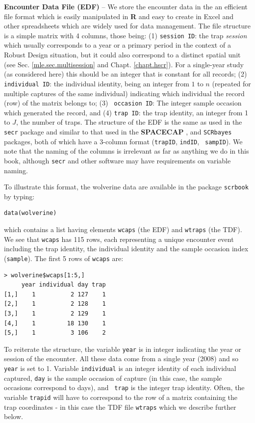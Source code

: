 {\flushleft \bf Encounter Data File (EDF)} --
We store the encounter data in the
an efficient file format which is easily manipulated in {\bf R} and
easy to create in  Excel and other spreadsheets which are widely used
for data management.
The file
structure is a simple matrix with 4 columns, those being: (1)
\mbox{\tt session ID}: the trap
{\it session} which usually corresponds to a year or a primary period
in the context of a Robust Design situation, but it could also
correspond to a distinct spatial unit (see
Sec. \ref{mle.sec.multisession} and Chapt. \ref{chapt.hscr}).
For a single-year study (as considered here) this
should be an integer  that is constant for all records; (2) \mbox{\tt
  individual ID}: the
individual identity, being an integer from $1$ to $n$ (repeated for
multiple captures of the same individual) indicating which
individual the record (row) of the matrix belongs to; (3) \mbox{\tt
  occasion ID}: The integer sample
occasion which generated the record, and (4) \mbox{\tt trap ID}: the
trap identity, an
integer from 1 to $J$, the number of traps.  The structure of the EDF
is the same as used in the \mbox{\tt secr} package \citep{efford:2011}
and similar to that used
in the {\bf SPACECAP} \citep{gopalaswamy_etal:2012mee}, and
\mbox{\tt SCRbayes} \citep{russell_etal:2012} packages, both of which
have a 3-column format (\mbox{\tt trapID}, \mbox{\tt indID}, \mbox{\tt
  sampID}). We note that the naming of the columns is irrelevant as
far as anything we do in this book, although \mbox{\tt secr} and other
software may have requirements on variable naming. 

To illustrate this format, the wolverine data are available in the
package \mbox{\tt scrbook} by typing:
\begin{verbatim}
data(wolverine)
\end{verbatim}
which contains a list having elements \mbox{\tt wcaps} (the EDF) and
\mbox{\tt wtraps} (the TDF).  We see that \mbox{\tt wcaps} has 115
rows, each representing a unique encounter event including the trap
identity, the individual identity and the sample occasion index
(\mbox{\tt sample}).  The first 5 rows of \mbox{\tt wcaps} are:
{\small
\begin{verbatim}
> wolverine$wcaps[1:5,]
     year individual day trap
[1,]    1          2 127    1
[2,]    1          2 128    1
[3,]    1          2 129    1
[4,]    1         18 130    1
[5,]    1          3 106    2
\end{verbatim}
}
To reiterate the structure, the variable \mbox{\tt year} is in
integer indicating the year or session of the encounter. All these
data come from a single year (2008) and so \mbox{\tt year} is set to
1. Variable \mbox{\tt individual} is an integer identity of each
individual captured, \mbox{\tt day} is the sample occasion of capture
(in this case, the sample occasions correspond to days), and \mbox{\tt
  trap} is the integer trap identity.
Often, the variable \mbox{\tt trapid} will have to
correspond to the row of a matrix containing the trap coordinates - in
this case the TDF file \mbox{\tt wtraps} which we describe further below.


